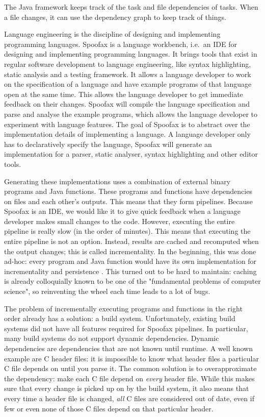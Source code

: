 The Java framework keeps track of the task and file dependencies of tasks.
When a file changes, it can use the dependency graph to keep track of things.




Language engineering is the discipline of designing and implementing programming languages.
Spoofax is a language workbench, i.e.\ an IDE for designing and implementing programming languages.
It brings tools that exist in regular software development to language engineering, like syntax highlighting, static analysis and a testing framework.
It allows a language developer to work on the specification of a language and have example programs of that language open at the same time.
This allows the language developer to get immediate feedback on their changes.
Spoofax will compile the language specification and parse and analyse the example programs, which allows the language developer to experiment with language features.
The goal of Spoofax is to abstract over the implementation details of implementing a language.
A language developer only has to declaratively specify the language, Spoofax will generate an implementation for a parser, static analyser, syntax highlighting and other editor tools.

Generating these implementations uses a combination of external binary programs and Java functions.
These programs and functions have dependencies on files and each other's outputs.
This means that they form pipelines.
Because Spoofax is an IDE, we would like it to give quick feedback when a language developer makes small changes to the code.
However, executing the entire pipeline is really slow (in the order of minutes).
This means that executing the entire pipeline is not an option.
Instead, results are cached and recomputed when the output changes; this is called incrementality.
In the beginning, this was done ad-hoc: every program and Java function would have its own implementation for incrementality and persistence .
This turned out to be hard to maintain: caching is already colloquially known to be one of the "fundamental problems of computer science", so reinventing the wheel each time leads to a lot of bugs.

The problem of incrementally executing programs and functions in the right order already has a solution: a build system.
Unfortunately, existing build systems did not have all features required for Spoofax pipelines.
In particular, many build systems do not support dynamic dependencies.
Dynamic dependencies are dependencies that are not known until runtime.
A well known example are C header files: it is impossible to know what header files a particular C file depends on until you parse it.
The common solution is to overapproximate the dependency: make each C file depend on \emph{every} header file.
While this makes sure that every change is picked up on by the build system, it also means that every time a header file is changed, \emph{all} C files are considered out of date, even if few or even none of those C files depend on that particular header.


